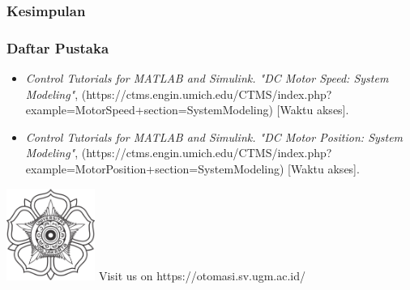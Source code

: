 \documentclass[10pt,xcolor={dvipsnames}]{beamer}
\begin{document}
\begin{frame}
	\frametitle{Kesimpulan}
	
\end{frame}

\begin{frame}
	\frametitle{Daftar Pustaka}
		\begin{itemize}
			\item  \textit{Control Tutorials for MATLAB and Simulink. "DC Motor Speed: System Modeling"}, (https://ctms.engin.umich.edu/CTMS/index.php?example=MotorSpeed+section=SystemModeling) [Waktu akses].
			\item \textit{Control Tutorials for MATLAB and Simulink. "DC Motor Position: System Modeling"}, (https://ctms.engin.umich.edu/CTMS/index.php?example=MotorPosition+section=SystemModeling) [Waktu akses].
		\end{itemize}
\end{frame}

\begin{frame}
	\begin{Center}
	\includegraphics[height=3cm]{Lambang dan logo UGM/Lambang UGM-hitam.png}
	\vspace{0.5cm}
	\newline Visit us on https://otomasi.sv.ugm.ac.id/
	\end{Center}
\end{frame}
\end{document}
